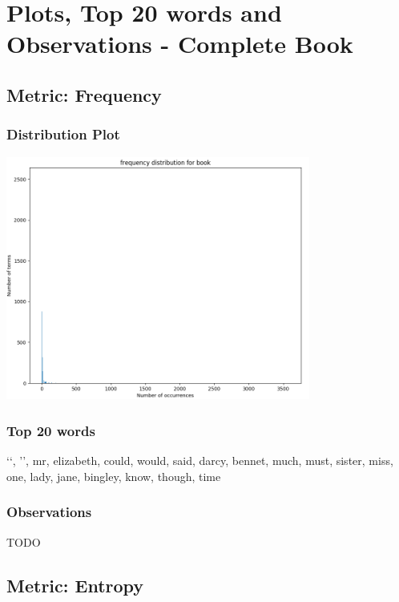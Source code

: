 \documentclass{article}
\begin{document}
\section{Plots, Top 20 words and Observations - Complete Book}
\subsection{Metric: Frequency}
\subsubsection{Distribution Plot}
\begin{flushleft}
    \includegraphics[width=0.75\textwidth]{./images/frequency-distribution-book.png}
\end{flushleft}
\subsubsection{Top 20 words}
\begin{flushleft}
	\lq\lq, \rq\rq, mr, elizabeth, could, would, said, darcy, bennet, much, must, sister, miss, one, lady, jane, bingley, know, though, time
\end{flushleft}
\subsubsection{Observations}
TODO

\newpage
\subsection{Metric: Entropy}
\end{document}

